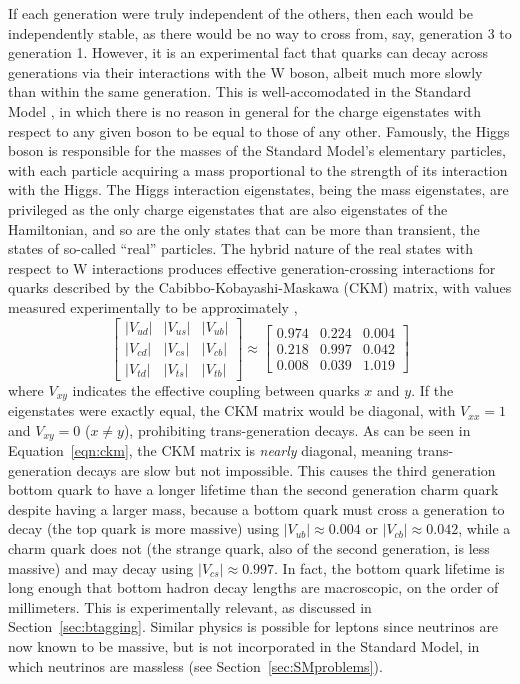   If each generation were truly independent of the others, then each would be independently stable, as there would be no way to cross from, say, generation 3 to generation 1.
  However, it is an experimental fact that quarks can decay across generations via their interactions with the W boson, albeit much more slowly than within the same generation.
  This is well-accomodated in the Standard Model \cite{cabibbo,ckm}, in which there is no reason in general for the charge eigenstates with respect to any given boson to be equal to those of any other.
  Famously, the Higgs boson is responsible for the masses of the Standard Model's elementary particles, with each particle acquiring a mass proportional to the strength of its interaction with the Higgs.
  The Higgs interaction eigenstates, being the mass eigenstates, are privileged as the only charge eigenstates that are also eigenstates of the Hamiltonian, and so are the only states that can be more than transient, the states of so-called ``real'' particles.
  The hybrid nature of the real states with respect to W interactions produces effective generation-crossing interactions for quarks described by the Cabibbo-Kobayashi-Maskawa (CKM) matrix, with values measured experimentally to be approximately \cite{pdg},
  \begin{equation} \label{eqn:ckm}
    \begin{bmatrix} 
      |V_{ud}| & |V_{us}| & |V_{ub}| \\
      |V_{cd}| & |V_{cs}| & |V_{cb}| \\
      |V_{td}| & |V_{ts}| & |V_{tb}| 
    \end{bmatrix}
\approx
    \begin{bmatrix} 
      0.974 & 0.224 & 0.004 \\
      0.218 & 0.997 & 0.042 \\
      0.008 & 0.039 & 1.019
    \end{bmatrix}
  \end{equation}
  where $V_{xy}$ indicates the effective coupling between quarks $x$ and $y$.
  If the eigenstates were exactly equal, the CKM matrix would be diagonal, with $V_{xx} = 1$ and $V_{xy} = 0$ ($x \neq y$), prohibiting trans-generation decays.
  As can be seen in Equation~\ref{eqn:ckm}, the CKM matrix is {\it nearly} diagonal, meaning trans-generation decays are slow but not impossible.
  This causes the third generation bottom quark to have a longer lifetime than the second generation charm quark despite having a larger mass, because a bottom quark must cross a generation to decay  (the top quark is more massive) using $|V_{ub}| \approx 0.004$ or $|V_{cb}| \approx 0.042$, while a charm quark does not (the strange quark, also of the second generation, is less massive) and may decay using $|V_{cs}| \approx 0.997$.
  In fact, the bottom quark lifetime is long enough that bottom hadron decay lengths are macroscopic, on the order of millimeters.
  This is experimentally relevant, as discussed in Section~\ref{sec:btagging}.
  Similar physics is possible for leptons since neutrinos are now known to be massive, but is not incorporated in the Standard Model, in which neutrinos are massless (see Section~\ref{sec:SMproblems}).

